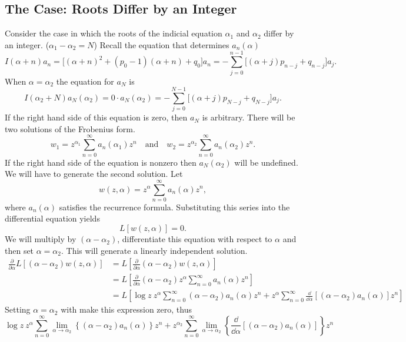 













\subsection{The Case: Roots Differ by an Integer}
Consider the case in which the roots of the indicial equation $\alpha_1$
and $\alpha_2$ differ by an integer. ($\alpha_1 - \alpha_2 = N$) 
Recall the equation that determines $a_n(\alpha)$ 
\[ I(\alpha+n)a_n = \Big[(\alpha+n)^2 + (p_0-1)(\alpha+n)+q_0\Big]a_n 
= - \sum_{j=0}^{n-1} \Big[(\alpha+j)p_{n-j} + q_{n-j}\Big]a_j.\]
When $\alpha = \alpha_2$ the equation for $a_N$ is
\[ I(\alpha_2 + N) a_N(\alpha_2) = 0 \cdot a_N(\alpha_2)  
= - \sum_{j=0}^{N-1} \Big[(\alpha+j)p_{N-j} + q_{N-j}\Big]a_j.\]
If the right hand side of this equation is zero, then $a_N$ is arbitrary.
There will
be two solutions of the Frobenius form.
\[ w_1 = z^{\alpha_1} \sum_{n=0}^\infty a_n(\alpha_1) z^n \quad \mathrm{and} \quad
w_2 = z^{\alpha_2} \sum_{n=0}^\infty a_n(\alpha_2) z^n.\]
If the right hand side of the equation is nonzero
then $a_N(\alpha_2)$ will be undefined.
We will have to generate the second solution.  Let
\[ w(z,\alpha) = z^\alpha \sum_{n=0}^\infty a_n(\alpha) z^n,\]
where $a_n(\alpha)$ satisfies the recurrence formula.
Substituting this series into the differential equation yields
\[ L[w(z,\alpha)] = 0.\]
We will multiply by $(\alpha-\alpha_2)$, 
differentiate this equation with respect to $\alpha$ and then set
$\alpha = \alpha_2$.  This will generate a linearly independent solution.
\begin{align*}
  \frac{\partial}{\partial \alpha} L[(\alpha-\alpha_2) w(z, \alpha)]
  &= L\left[ \frac{\partial}{\partial \alpha} (\alpha-\alpha_2)w(z,\alpha) \right] \\
  &= L\left[ \frac{\partial}{\partial \alpha} (\alpha-\alpha_2)
    z^\alpha \sum_{n=0}^\infty a_n(\alpha) z^n \right] \\
  &= L\left[ \log z\ z^\alpha \sum_{n=0}^\infty (\alpha-\alpha_2)a_n(\alpha)z^n
    +z^\alpha \sum_{n=0}^\infty \frac{\dd}{\dd \alpha} [(\alpha-\alpha_2)
    a_n(\alpha)] z^n \right]
\end{align*}
Setting $\alpha = \alpha_2$ with make this expression zero, thus
\[ \log z\ z^\alpha \sum_{n=0}^\infty \lim_{\alpha \to \alpha_2} 
\left\{ (\alpha-\alpha_2)a_n(\alpha) \right\} z^n
+z^{\alpha_2} \sum_{n=0}^\infty \lim_{\alpha \to \alpha_2} \left\{
  \frac{\dd}{\dd \alpha} [(\alpha-\alpha_2)a_n(\alpha)] \right\} z^n \]
